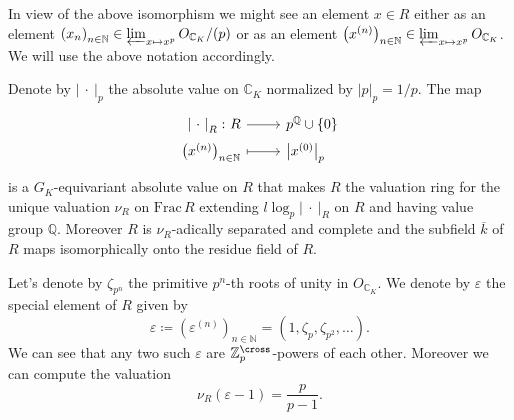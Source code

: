 \begin{ntt}[]
	In view of the above isomorphism we might see an element $x \in R$
	either as an element 
	$\left( x_n \right)_{n \in \mathbb{N}} \in \varprojlim_{x \mapsto x^p} O_{\mathbb{C}_K}/ (p)$
	or as an element
	$\left( x^{(n)} \right)_{n \in \mathbb{N}} \in \varprojlim_{x \mapsto x^p} O_{\mathbb{C}_K}$.
	We will use the above notation accordingly.
\end{ntt}


\begin{lem}
	Denote by $\left| \ \cdot \ \right|_p$ the absolute value on $\mathbb{C}_K$
	normalized by $\left| p \right|_p = 1/p$.
	The map
	\begin{equation*}
	\begin{tikzcd}[row sep = 0ex
		,/tikz/column 1/.append style={anchor=base east}
		,/tikz/column 2/.append style={anchor=base west}]
		\left| \ \cdot \ \right|_R\colon R \arrow[r, "", rightarrow] &
		p^{\mathbb{Q}} \cup \left\{ 0 \right\} \\
		\left( x^{(n)} \right)_{n \in \mathbb{N}} \arrow[r, "", mapsto] & 
		\left| x^{(0)} \right|_p
	\end{tikzcd}
	\end{equation*} 
	is a $G_K$-equivariant absolute value on $R$ that makes
	$R$ the valuation ring for the unique valuation
	$\nu_R$ on $\mathrm{Frac}\, R$ extending
	$l \log_p \left| \ \cdot \ \right|_R$ on $R$
	and having value group $\mathbb{Q}$.
	Moreover $R$ is $\nu_R$-adically separated and complete
	and the subfield $\overline{k}$ of $R$ maps
	isomorphically onto the residue field of $R$.
\end{lem} 


\begin{ntt}[]
	Let's denote by $\zeta_{p^n}$ the primitive $p^n$-th roots of unity
	in $O_{\mathbb{C}_K}$.
	We denote by $\varepsilon$ the special element of $R$ given by
	\begin{equation*}
		\varepsilon \coloneqq \left( \varepsilon^{(n)} \right)_{n \in \mathbb{N}} =
		\left( 1, \zeta_p, \zeta_{p^2}, \ldots \right)
	.\end{equation*}
	We can see that any two such $\varepsilon$
	are $\mathbb{Z}_{p}^\cross$-powers of each other.
	Moreover we can compute the valuation
	\begin{equation*}
		\nu_R \left( \varepsilon - 1 \right) = \frac{ p }{ p - 1 }
	.\end{equation*}
\end{ntt}



